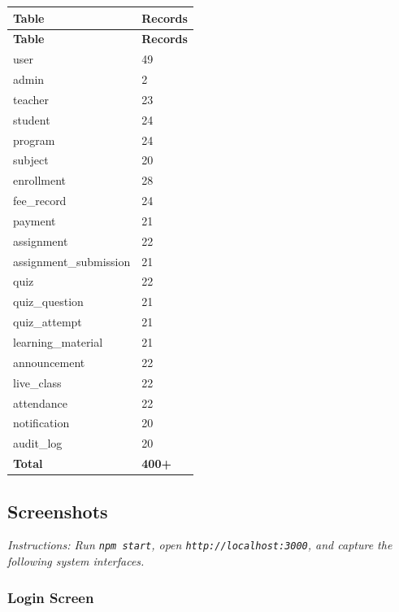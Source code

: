 \documentclass[12pt,a4paper]{report}
\begin{document}
\begin{longtable}{|L{5cm}|C{3.5cm}|}
\hline
\textbf{Table} & \textbf{Records} \\
\hline
\endfirsthead
\hline
\textbf{Table} & \textbf{Records} \\
\hline
\endhead
user & 49 \\ \hline
admin & 2 \\ \hline
teacher & 23 \\ \hline
student & 24 \\ \hline
program & 24 \\ \hline
subject & 20 \\ \hline
enrollment & 28 \\ \hline
fee\_record & 24 \\ \hline
payment & 21 \\ \hline
assignment & 22 \\ \hline
assignment\_submission & 21 \\ \hline
quiz & 22 \\ \hline
quiz\_question & 21 \\ \hline
quiz\_attempt & 21 \\ \hline
learning\_material & 21 \\ \hline
announcement & 22 \\ \hline
live\_class & 22 \\ \hline
attendance & 22 \\ \hline
notification & 20 \\ \hline
audit\_log & 20 \\ \hline
\textbf{Total} & \textbf{400+} \\
\hline
\end{longtable}


\subsection{Screenshots}

\textit{Instructions: Run \texttt{npm start}, open \texttt{http://localhost:3000}, and capture the following system interfaces.}


\subsubsection*{Login Screen}
\end{document}
